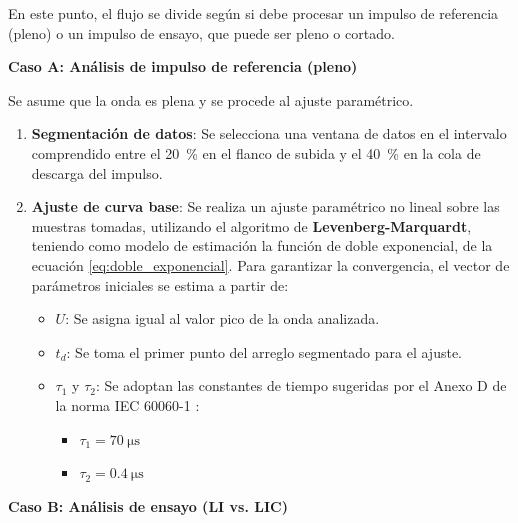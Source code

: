 En este punto, el flujo se divide según si debe procesar un impulso de referencia (pleno) o un impulso de ensayo, que puede ser pleno o cortado.

\textbf{Caso A: Análisis de impulso de referencia (pleno)}

Se asume que la onda es plena y se procede al ajuste paramétrico.
\begin{enumerate}[resume]
    \item \textbf{Segmentación de datos}: Se selecciona una ventana de datos en el intervalo comprendido entre el \qty{20}{\percent} en el flanco de subida y el \qty{40}{\percent} en la cola de descarga del impulso.
    \item \textbf{Ajuste de curva base}: Se realiza un ajuste paramétrico no lineal sobre las muestras tomadas, utilizando el algoritmo de \textbf{Levenberg-Marquardt}, teniendo como modelo de estimación la función de doble exponencial, de la ecuación \ref{eq:doble_exponencial}.
    Para garantizar la convergencia, el vector de parámetros iniciales se estima a partir de:
    \begin{itemize}
        \item $U$: Se asigna igual al valor pico de la onda analizada.
        \item $t_d$: Se toma el primer punto del arreglo segmentado para el ajuste.
        \item $\tau_1$ y $\tau_2$: Se adoptan las constantes de tiempo sugeridas por el Anexo D de la norma IEC 60060-1 \cite{iec60060_1}:
        \begin{itemize}
            \item $\tau_1 = \qty{70}{\micro\second}$
            \item $\tau_2 = \qty{0.4}{\micro\second}$
        \end{itemize}
    \end{itemize}
\end{enumerate}

\textbf{Caso B: Análisis de ensayo (LI vs. LIC)}

